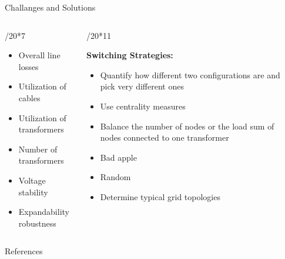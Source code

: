 \documentclass[final]{beamer}
\newlength{\sepwidth}
\newlength{\colwidth}
\newcommand{\separatorcolumn}{\begin{column}{\sepwidth}\end{column}}
\begin{document}
\begin{frame}[t]
\begin{columns}[t]
\begin{column}{\colwidth}
\begin{block}{Challanges and Solutions}
\begin{columns}[t]
\begin{column}{\colwidth/20*7}
        \begin{itemize}
          \item Overall line losses
          \item Utilization of cables
          \item Utilization of transformers
          \item Number of transformers
          \item Voltage stability
          \item Expandability robustness
        \end{itemize}
    

    \end{column}

    \begin{column}{\colwidth/20*11}
      
      \textbf{Switching Strategies:}

        \begin{itemize}
          \item Quantify how different two configurations are and pick very different ones
          \item Use centrality measures
          \item Balance the number of nodes or the load sum of nodes connected to one transformer
          \item Bad apple
          \item Random
          \item Determine typical grid topologies
        \end{itemize}
    
    \end{column}

  \end{columns}

\end{block}

  


 

  \begin{block}{References}

    \printbibliography


  \end{block}

\end{column}

\separatorcolumn

\end{columns}

\end{frame}
\end{document}
